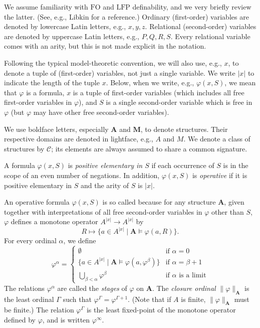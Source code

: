\documentclass{lmcs}
\newcommand{\LFP}{\mathrm{LFP}}
\newcommand{\FO}{\mathrm{FO}}
\newcommand{\A}{\mathbf{A}}
\newcommand{\M}{\mathbf{M}}
\theoremstyle{thmC}
\begin{document}
We assume familiarity with $\FO$ and $\LFP$ definability, and we very briefly review the latter. (See, e.g., Libkin \cite{Lib} for a reference.) Ordinary (first-order) variables are denoted by lowercase Latin letters, e.g., $x,y,z$. Relational (second-order) variables are denoted by uppercase Latin letters, e.g., $P,Q,R,S$. Every relational variable comes with an arity, but this is not made explicit in the notation.

Following the typical model-theoretic convention, we will also use, e.g., $x$, to denote a tuple of (first-order) variables, not just a single variable. We write $|x|$ to indicate the length of the tuple $x$. Below, when we write, e.g., $\varphi(x,S)$, we mean that $\varphi$ is a formula, $x$ is a tuple of first-order variables (which includes all free first-order variables in $\varphi$), and $S$ is a single second-order variable which is free in $\varphi$ (but $\varphi$ may have other free second-order variables).

We use boldface letters, especially $\A$ and $\M$, to denote structures. Their respective domains are denoted in lightface, e.g., $A$ and $M$. We denote a class of structures by $\mathcal{C}$; its elements are always assumed to share a common signature.

\begin{defi}
A formula $\varphi(x,S)$ is \emph{positive elementary in $S$} if each occurrence of $S$ is in the scope of an even number of negations. In addition, $\varphi(x,S)$ is \emph{operative} if it is positive elementary in $S$ and the arity of $S$ is $|x|$.
\end{defi}

An operative formula $\varphi(x,S)$ is so called because for any structure $\A$, given together with  interpretations of all free second-order variables in $\varphi$ other than $S$, $\varphi$ defines a monotone operator $A^{|x|} \to A^{|x|}$ by
\[ R \mapsto \{a\in A^{|x|} \mid \A \models \varphi(a,R)\}.\]
For every ordinal $\alpha$, we define
\[ \varphi^\alpha = \begin{cases}
\emptyset & \text{if } \alpha =0 \\
\{a\in A^{|x|} \mid \A \models \varphi(a,\varphi^\beta) \} & \text{if } \alpha = \beta + 1 \\
\bigcup_{\beta < \alpha}\varphi^\beta & \text{if } \alpha \text{ is a limit}
\end{cases}\]
The relations $\varphi^\alpha$ are called the \emph{stages} of $\varphi$ on $\A$. The \emph{closure ordinal} $\|\varphi \|_\A$ is the least ordinal $\Gamma$ such that $\varphi^\Gamma = \varphi^{\Gamma +1}$. (Note that if $A$ is finite, $\|\varphi\|_\A$ must be finite.) The relation $\varphi^\Gamma$ is the least fixed-point of the monotone operator defined by $\varphi$, and is written $\varphi^\infty$.
\end{document}
